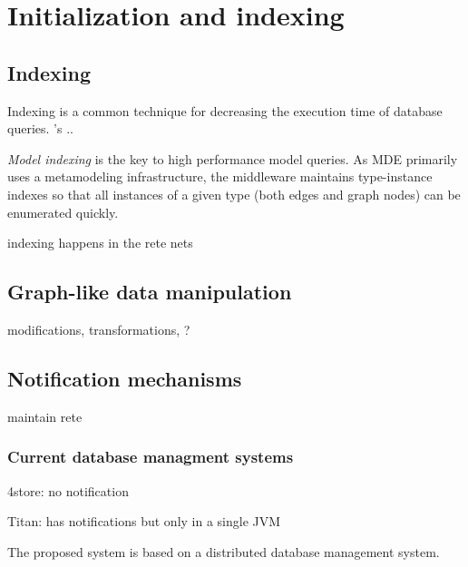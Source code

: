 \section{Initialization and indexing}
\label{sec:indexing}

\subsection{Indexing}

Indexing is a common technique for decreasing the execution time of database queries. \iqd{}'s ..

\emph{Model indexing} is the key to high performance model queries. As MDE primarily uses a metamodeling infrastructure, the \iqd{} middleware maintains type-instance indexes so that all instances of a given type (both edges and graph nodes) can be enumerated quickly.

indexing happens in the rete nets 

\subsection{Graph-like data manipulation}

modifications, transformations, ?

\subsection{Notification mechanisms}

maintain rete

\subsubsection{Current database managment systems}

4store: no notification

Titan: has notifications but only in a single JVM

The proposed system is based on a distributed database management system.


